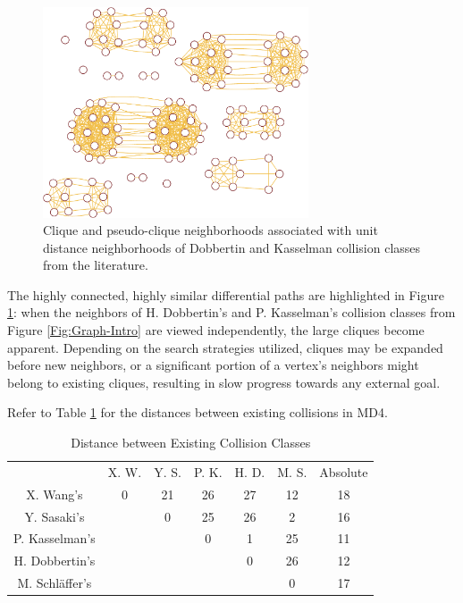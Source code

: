 \documentclass[conference]{IEEEtran}
\begin{document}
\begin{figure}
\begin{center}
\includegraphics[width=0.7\textwidth]{Figs/graph-clique-crop.pdf}
\caption{Clique and pseudo-clique neighborhoods associated with
  unit distance neighborhoods of Dobbertin and Kasselman collision
  classes from the literature.}
\label{Fig:Graph-Clique}
\end{center}
\end{figure}

The highly connected, highly similar differential paths are highlighted in
Figure \ref{Fig:Graph-Clique}: when the neighbors of H. Dobbertin's and
P. Kasselman's collision classes from Figure \ref{Fig:Graph-Intro} are viewed
independently, the large cliques become apparent. Depending on the search
strategies utilized, cliques may be expanded before new neighbors, or a
significant portion of a vertex's neighbors might belong to existing cliques,
resulting in slow progress towards any external goal.

Refer to Table \ref{table:distance} for the distances between existing
collisions in MD4.

\begin{table}
    \caption{Distance between Existing Collision Classes}
    \label{table:distance}
    \begin{tabular}{c c c c c c c}
        & X. W. & Y. S. & P. K. & H. D. & M. S. & Absolute \\
        X. Wang's & 0 & 21 & 26 & 27 & 12 & 18 \\
        Y. Sasaki's & & 0 & 25 & 26 & 2 & 16 \\
        P. Kasselman's &  &  & 0 & 1 & 25 & 11 \\
        H. Dobbertin's &  &  &  & 0 & 26 & 12 \\
        M. Schl{\"a}ffer's &  &  &  &  & 0 & 17 \\
    \end{tabular}
\end{table}
\end{document}
